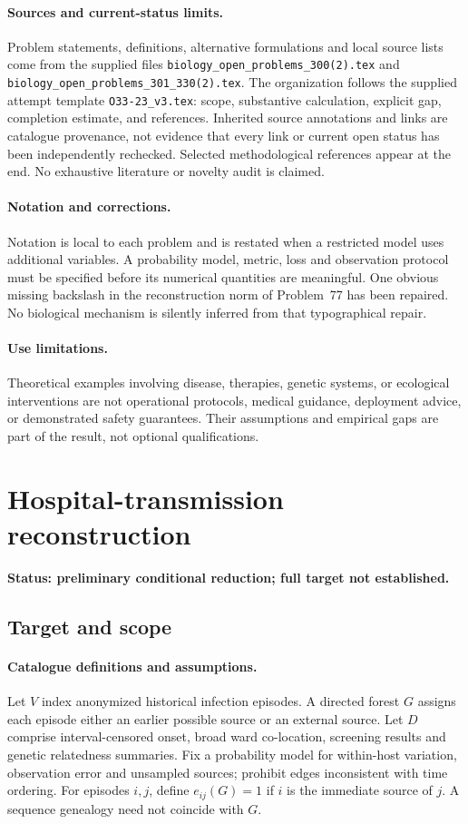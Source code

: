 \documentclass[11pt]{article}
\begin{document}
\paragraph{Sources and current-status limits.}
Problem statements, definitions, alternative formulations and local source lists
come from the supplied files
\texttt{biology\_open\_problems\_300(2).tex} and
\texttt{biology\_open\_problems\_301\_330(2).tex}.
The organization follows the supplied attempt template
\texttt{O33-23\_v3.tex}: scope, substantive calculation, explicit gap,
completion estimate, and references. Inherited source annotations and links are
catalogue provenance, not evidence that every link or current open status has
been independently rechecked. Selected methodological references appear at the
end. No exhaustive literature or novelty audit is claimed.

\paragraph{Notation and corrections.}
Notation is local to each problem and is restated when a restricted model uses
additional variables. A probability model, metric, loss and observation protocol
must be specified before its numerical quantities are meaningful. One obvious
missing backslash in the reconstruction norm of Problem~77 has been repaired.
No biological mechanism is silently inferred from that typographical repair.

\paragraph{Use limitations.}
Theoretical examples involving disease, therapies, genetic systems, or ecological
interventions are not operational protocols, medical guidance, deployment advice,
or demonstrated safety guarantees. Their assumptions and empirical gaps are part
of the result, not optional qualifications.


\section*{Hospital-transmission reconstruction}
\label{prob:216}
\noindent\textbf{Status: preliminary conditional reduction; full target not established.}
\subsection{Target and scope}
\paragraph{Catalogue definitions and assumptions.}
Let $V$ index anonymized historical infection episodes. A directed forest $G$ assigns each episode either an earlier possible source or an external source. Let $D$ comprise interval-censored onset, broad ward co-location, screening results and genetic relatedness summaries. Fix a probability model for within-host variation, observation error and unsampled sources; prohibit edges inconsistent with time ordering. For episodes $i,j$, define $e_{ij}(G)=1$ if $i$ is the immediate source of $j$. A sequence genealogy need not coincide with $G$.
\end{document}
